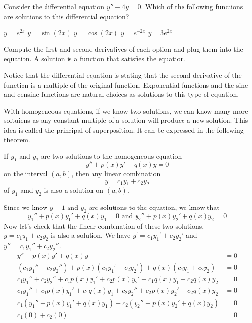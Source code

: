 \documentclass{ximera}
\begin{document}
	\begin{question}
		Consider the differential equation $ y''-4y=0 $.  Which of the following functions are solutions to this differential equation?
		\begin{selectAll}
			\choice[correct] $ y = e^{2x} $
			\choice $ y=\sin(2x) $
			\choice $ y=\cos(2x) $
			\choice[correct] $ y = e^{-2x} $
			\choice[correct] $ y = 3e^{2x} $
		\end{selectAll}
		\begin{hint}
			Compute the first and second derivatives of each option and plug them into the equation.  A solution is a function that satisfies the equation.
		\end{hint}
		\begin{feedback}
			Notice that the differential equation is stating that the second derivative of the function is a multiple of the original function.  Exponential functions and the sine and consine functions are natural choices as solutions to this type of equation.
		\end{feedback}
	\end{question}
	
	With homogeneous equations, if we know two solutions, we can know many more soltuions as any constant multiple of a solution will produce a new solution.  This idea is called the principal of superposition.  It can be expressed in the following theorem.
	
	\begin{theorem}
		If $ y_1 $ and $ y_2 $ are two solutions to the homogeneous equation 
		\[
			y'' +p(x)y'+q(x)y = 0
		\]
		on the interval $ (a,b) $, then any linear combination
		\[
			y = c_1y_1 + c_2y_2
		\]
		of $ y_1 $ amd $ y_2 $ is also a solution on $ (a,b) $.
	\end{theorem}
	\begin{explanation}
		Since we know $ y-1 $ and $ y_2 $ are solutions to the equation, we know that
		\[
			y_1''+p(x)y_1'+q(x)y_1 = 0 \mbox{ and } y_2''+p(x)y_2'+q(x)y_2 = 0
		\]
		Now let's check that the linear combination of these two solutions, $ y=c_1y_1 + c_2y_2 $ is also a solution.  We have $ y' = c_1y_1' + c_2y_2' $ and $ y'' = c_1y_1'' + c_2y_2'' $.
		\begin{align*}
			y'' + p(x)y' + q(x)y &= 0 \\
			(c_1y_1'' + c_2y_2'') + p(x)(c_1y_1' + c_2y_2') + q(x)(c_1y_1 + c_2y_2) &= 0 \\
			c_1y_1'' + c_2y_2'' + c_1p(x)y_1' + c_2p(x)y_2' + c_1q(x)y_1 + c_2q(x)y_2 &= 0 \\
			c_1y_1'' + c_1p(x)y_1' + c_1q(x)y_1 + c_2y_2'' + c_2p(x)y_2' + c_2q(x)y_2 &= 0 \\
			c_1(y_1'' + p(x)y_1' + q(x)y_1) + c_2(y_2'' + p(x)y_2' + q(x)y_2) &= 0 \\
			c_1(0) + c_2(0) &= 0
		\end{align*}
	\end{explanation}
	
\end{document}
